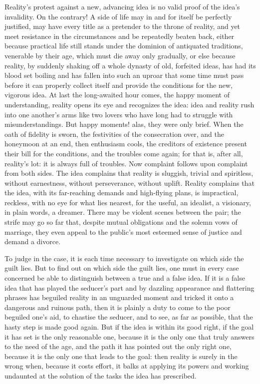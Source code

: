 \documentclass[12pt,a4paper,openany]{book}
\newcommand{\opage}[1]{\marginnote{\footnotesize\textit{[#1]}}}
\begin{document}
Reality's protest against a new, advancing
idea is no valid proof of the idea's invalidity.
On the contrary! A side of life may in and for itself be perfectly
justified, may have every title as a pretender
to the throne of reality, and yet meet resistance
in the circumstances and be repeatedly
beaten back, either because practical life still
stands under the dominion of antiquated traditions, venerable
by their age, which must die away only gradually,
or else because reality, by suddenly
shaking off a whole dynasty of old, forfeited
\setcounter{footnote}{0}%
\opage{2}ideas, has had its blood set boiling and has fallen into such
an uproar that some time must pass before it
can properly collect itself and provide the conditions for the
new, vigorous idea. At last the long-awaited
hour comes, the happy moment of understanding, reality
opens its eye and recognizes the idea: idea and
reality rush into one another's arms like two lovers
who have long had to struggle with misunderstandings. But
happy moments! alas, they were only brief. When
the oath of fidelity is sworn, the festivities of the consecration over,
and the honeymoon at an end, then enthusiasm cools,
the creditors of existence present their bill
for the conditions, and the troubles come again;
for that is, after all, reality's lot: it is always
full of troubles. Now complaint follows upon complaint from both
sides. The idea complains that reality is sluggish, trivial %
and spiritless, without earnestness, without perseverance, without uplift.
Reality complains that the idea, with its far-reaching
demands and high-flying plans, is impractical,
reckless, with no eye for what lies nearest, for the useful, an
idealist, a visionary, in plain words, a dreamer. There may
be violent scenes between the pair; the strife may go
so far that, despite mutual obligations and
the solemn vows of marriage, they even appeal to the public's
most esteemed sense of justice and demand a divorce.

To judge in the case, it is each time necessary
to investigate on which side the guilt lies.
But to find out on which side the guilt lies, one must
in every case concerned be able to distinguish
between a true and a false idea. If it is a false idea
that has played the seducer's part and by dazzling
\setcounter{footnote}{0}%
\opage{3}appearance and flattering phrases has beguiled reality
in an unguarded moment and tricked it onto a dangerous and
ruinous path, then it is plainly a duty to come to
the poor beguiled one's aid, to chastise the seducer, and
to see, as far as possible, that the hasty step is made good
again. But if the idea is within its good right, if the
goal it has set is the only reasonable one, because it
is the only one that truly answers to the need of the age,
and the path it has pointed out the only right one, because it
is the only one that leads to the goal: then reality is surely
in the wrong when, because it costs effort,
it balks at applying its powers and working undaunted
at the solution of the tasks the idea has prescribed.
\end{document}
